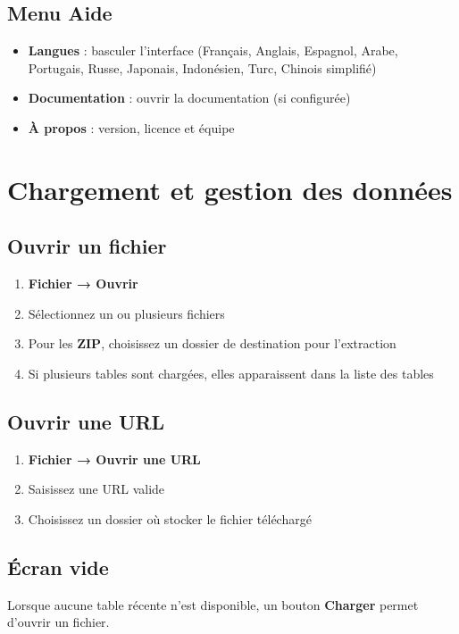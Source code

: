 \documentclass[11pt, a4paper]{article}
\begin{document}
\subsection{Menu Aide}
\begin{itemize}
    \item \textbf{Langues} : basculer l'interface (Français, Anglais, Espagnol, Arabe, Portugais, Russe, Japonais, Indonésien, Turc, Chinois simplifié)
    \item \textbf{Documentation} : ouvrir la documentation (si configurée)
    \item \textbf{À propos} : version, licence et équipe
\end{itemize}

\section{Chargement et gestion des données}

\subsection{Ouvrir un fichier}
\begin{enumerate}
    \item \textbf{Fichier → Ouvrir}
    \item Sélectionnez un ou plusieurs fichiers
    \item Pour les \textbf{ZIP}, choisissez un dossier de destination pour l'extraction
    \item Si plusieurs tables sont chargées, elles apparaissent dans la liste des tables
\end{enumerate}

\subsection{Ouvrir une URL}
\begin{enumerate}
    \item \textbf{Fichier → Ouvrir une URL}
    \item Saisissez une URL valide
    \item Choisissez un dossier où stocker le fichier téléchargé
\end{enumerate}

\subsection{Écran vide}
Lorsque aucune table récente n'est disponible, un bouton \textbf{Charger} permet d'ouvrir un fichier.
\end{document}
